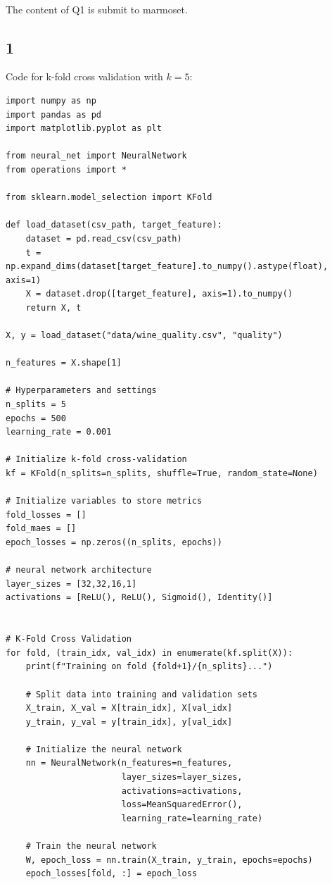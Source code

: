 \documentclass[12pt]{article}
\begin{document}
\subsection{}
The content of Q1 is submit to marmoset. 
\begin{enumerate}
\part{1} 
Code for k-fold cross validation with $k=5$:

\begin{lstlisting}
import numpy as np
import pandas as pd
import matplotlib.pyplot as plt

from neural_net import NeuralNetwork
from operations import *

from sklearn.model_selection import KFold

def load_dataset(csv_path, target_feature):
    dataset = pd.read_csv(csv_path)
    t = np.expand_dims(dataset[target_feature].to_numpy().astype(float), axis=1)
    X = dataset.drop([target_feature], axis=1).to_numpy()
    return X, t

X, y = load_dataset("data/wine_quality.csv", "quality")

n_features = X.shape[1]

# Hyperparameters and settings
n_splits = 5
epochs = 500
learning_rate = 0.001

# Initialize k-fold cross-validation
kf = KFold(n_splits=n_splits, shuffle=True, random_state=None)

# Initialize variables to store metrics
fold_losses = []
fold_maes = []
epoch_losses = np.zeros((n_splits, epochs))

# neural network architecture
layer_sizes = [32,32,16,1]
activations = [ReLU(), ReLU(), Sigmoid(), Identity()]


# K-Fold Cross Validation
for fold, (train_idx, val_idx) in enumerate(kf.split(X)):
    print(f"Training on fold {fold+1}/{n_splits}...")
    
    # Split data into training and validation sets
    X_train, X_val = X[train_idx], X[val_idx]
    y_train, y_val = y[train_idx], y[val_idx]
    
    # Initialize the neural network
    nn = NeuralNetwork(n_features=n_features, 
                       layer_sizes=layer_sizes, 
                       activations=activations, 
                       loss=MeanSquaredError(), 
                       learning_rate=learning_rate)
    
    # Train the neural network
    W, epoch_loss = nn.train(X_train, y_train, epochs=epochs)
    epoch_losses[fold, :] = epoch_loss
    

\end{lstlisting}
\end{enumerate}
\end{document}
